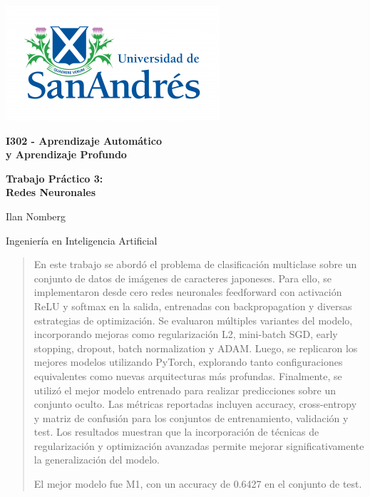 \documentclass[11pt]{article}
\begin{document}
\begin{titlepage}
    \centering
    \vspace*{2cm}
    \includegraphics[scale=1.8]{figures/Logo-udesa.png}\par
    \vspace{10pt}

    {\LARGE \textbf{I302 - Aprendizaje Automático\\ y Aprendizaje Profundo}\par}
    \vspace{1cm}

    {\LARGE \textbf{Trabajo Práctico 3: \\Redes Neuronales}\par}
    \vspace{4cm}
    
    {\LARGE {Ilan Nomberg}\par {Ingeniería en Inteligencia Artificial}}  %
    \vspace{4cm}
    
    \vspace{1cm}
    \Large{}
    \date{}
\end{titlepage}

\begin{abstract}
    En este trabajo se abordó el problema de clasificación multiclase sobre un conjunto de datos de imágenes de caracteres japoneses. Para ello, se implementaron desde cero redes neuronales feedforward con activación ReLU y softmax en la salida, entrenadas con backpropagation y diversas estrategias de optimización. Se evaluaron múltiples variantes del modelo, incorporando mejoras como regularización L2, mini-batch SGD, early stopping, dropout, batch normalization y ADAM. Luego, se replicaron los mejores modelos utilizando PyTorch, explorando tanto configuraciones equivalentes como nuevas arquitecturas más profundas. Finalmente, se utilizó el mejor modelo entrenado para realizar predicciones sobre un conjunto oculto. Las métricas reportadas incluyen accuracy, cross-entropy y matriz de confusión para los conjuntos de entrenamiento, validación y test. Los resultados muestran que la incorporación de técnicas de regularización y optimización avanzadas permite mejorar significativamente la generalización del modelo.

    El mejor modelo fue M1, con un accuracy de 0.6427 en el conjunto de test.
\end{abstract}
    
\end{document}
